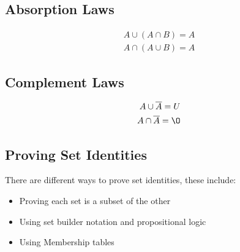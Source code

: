 \documentclass[12pt letter]{report}
\begin{document}
\subsection{Absorption Laws}
\begin{align*}
	A \cup \left( A \cap B \right) = A \\
	A \cap  \left( A \cup B  \right)  = A
\end{align*}

\subsection{Complement Laws}
\begin{align*}
	A \cup \overline{A} = U \\
	A \cap \overline{A} = \O
\end{align*}

\subsection{Proving Set Identities}

There are different ways to prove set identities, these include:
\begin{itemize}
	\item Proving each set is a subset of the other
	\item Using set builder notation and propositional logic
	\item Using Membership tables
\end{itemize}

\end{document}
